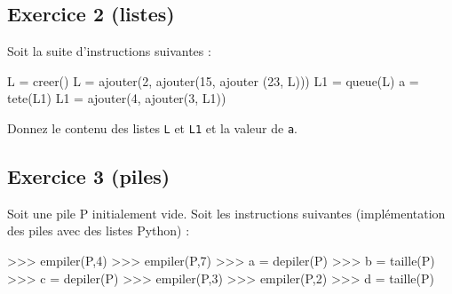 \documentclass[
  a4paper,
  DIV=11,
  numbers=noendperiod]{scrartcl}
\newenvironment{Shaded}{\begin{snugshade}}{\end{snugshade}}
\newcommand{\DecValTok}[1]{\textcolor[rgb]{0.68,0.00,0.00}{#1}}
\newcommand{\NormalTok}[1]{\textcolor[rgb]{0.00,0.23,0.31}{#1}}
\newcommand{\OperatorTok}[1]{\textcolor[rgb]{0.37,0.37,0.37}{#1}}
\begin{document}
\hypertarget{fa-solid-pencil-alt-exercice-2-listes}{%
\subsection{\texorpdfstring{ Exercice 2
(listes)}{ Exercice 2 (listes)}}\label{fa-solid-pencil-alt-exercice-2-listes}}

Soit la suite d'instructions suivantes :

\begin{Shaded}
\begin{Highlighting}[]
\NormalTok{L }\OperatorTok{=}\NormalTok{ creer()}
\NormalTok{L }\OperatorTok{=}\NormalTok{ ajouter(}\DecValTok{2}\NormalTok{, ajouter(}\DecValTok{15}\NormalTok{, ajouter (}\DecValTok{23}\NormalTok{, L)))}
\NormalTok{L1 }\OperatorTok{=}\NormalTok{ queue(L)}
\NormalTok{a }\OperatorTok{=}\NormalTok{ tete(L1)}
\NormalTok{L1 }\OperatorTok{=}\NormalTok{ ajouter(}\DecValTok{4}\NormalTok{, ajouter(}\DecValTok{3}\NormalTok{, L1))}
\end{Highlighting}
\end{Shaded}

Donnez le contenu des listes \texttt{L} et \texttt{L1} et la valeur de
\texttt{a}.

\hypertarget{fa-solid-pencil-alt-exercice-3-piles}{%
\subsection{\texorpdfstring{ Exercice 3
(piles)}{ Exercice 3 (piles)}}\label{fa-solid-pencil-alt-exercice-3-piles}}

Soit une pile P initialement vide. Soit les instructions suivantes
(implémentation des piles avec des listes Python) :

\begin{Shaded}
\begin{Highlighting}[]
\OperatorTok{\textgreater{}\textgreater{}\textgreater{}}\NormalTok{ empiler(P,}\DecValTok{4}\NormalTok{)}
\OperatorTok{\textgreater{}\textgreater{}\textgreater{}}\NormalTok{ empiler(P,}\DecValTok{7}\NormalTok{)}
\OperatorTok{\textgreater{}\textgreater{}\textgreater{}}\NormalTok{ a }\OperatorTok{=}\NormalTok{ depiler(P)}
\OperatorTok{\textgreater{}\textgreater{}\textgreater{}}\NormalTok{ b }\OperatorTok{=}\NormalTok{ taille(P)}
\OperatorTok{\textgreater{}\textgreater{}\textgreater{}}\NormalTok{ c }\OperatorTok{=}\NormalTok{ depiler(P)}
\OperatorTok{\textgreater{}\textgreater{}\textgreater{}}\NormalTok{ empiler(P,}\DecValTok{3}\NormalTok{)}
\OperatorTok{\textgreater{}\textgreater{}\textgreater{}}\NormalTok{ empiler(P,}\DecValTok{2}\NormalTok{)}
\OperatorTok{\textgreater{}\textgreater{}\textgreater{}}\NormalTok{ d }\OperatorTok{=}\NormalTok{ taille(P)}
\end{Highlighting}
\end{Shaded}
\end{document}
